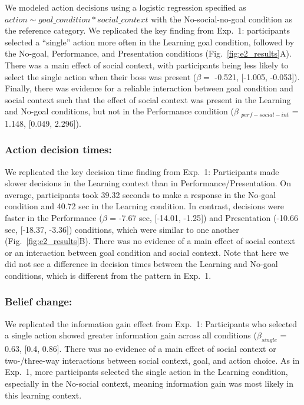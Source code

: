 \documentclass[10pt, letterpaper]{article}
\begin{document}
We modeled action decisions using a logistic regression specified as
\texttt{$action \sim goal\_condition * social\_context$} with the
No-social-no-goal condition as the reference category. We replicated the
key finding from Exp.~1: participants selected a ``single'' action more
often in the Learning goal condition, followed by the No-goal,
Performance, and Presentation conditions (Fig.~\ref{fig:e2_results}A).
There was a main effect of social context, with participants being less
likely to select the single action when their boss was present
(\(\beta =\) -0.521, {[}-1.005, -0.053{]}). Finally, there was evidence
for a reliable interaction between goal condition and social context
such that the effect of social context was present in the Learning and
No-goal conditions, but not in the Performance condition (\(\beta\)
\(_{perf-social-int}\) = 1.148, {[}0.049, 2.296{]}).

\subsubsection{Action decision times:}\label{action-decision-times-1}

We replicated the key decision time finding from Exp.~1: Participants
made slower decisions in the Learning context than in
Performance/Presentation. On average, participants took 39.32 seconds to
make a response in the No-goal condition and 40.72 sec in the Learning
condition. In contrast, decisions were faster in the Performance
(\(\beta\) = -7.67 sec, {[}-14.01, -1.25{]}) and Presentation (-10.66
sec, {[}-18.37, -3.36{]}) conditions, which were similar to one another
(Fig.~\ref{fig:e2_results}B). There was no evidence of a main effect of
social context or an interaction between goal condition and social
context. Note that here we did not see a difference in decision times
between the Learning and No-goal conditions, which is different from the
pattern in Exp.~1.

\subsubsection{Belief change:}\label{belief-change-1}

We replicated the information gain effect from Exp.~1: Participants who
selected a single action showed greater information gain across all
conditions (\(\beta_{single}\) = 0.63, {[}0.4, 0.86{]}. There was no
evidence of a main effect of social context or two-/three-way
interactions between social context, goal, and action choice. As in
Exp.~1, more participants selected the single action in the Learning
condition, especially in the No-social context, meaning information gain
was most likely in this learning context.
\end{document}
